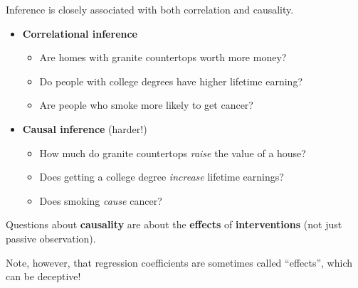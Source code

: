 \documentclass[
  letterpaper,
  DIV=11,
  numbers=noendperiod]{scrreprt}
\providecommand{\tightlist}{%
  \setlength{\itemsep}{0pt}\setlength{\parskip}{0pt}}\usepackage{longtable,booktabs,array}
\begin{document}
Inference is closely associated with both correlation and causality.

\begin{itemize}
\tightlist
\item
  \textbf{Correlational inference}

  \begin{itemize}
  \tightlist
  \item
    Are homes with granite countertops worth more money?
  \item
    Do people with college degrees have higher lifetime earning?
  \item
    Are people who smoke more likely to get cancer?
  \end{itemize}
\item
  \textbf{Causal inference} (harder!)

  \begin{itemize}
  \tightlist
  \item
    How much do granite countertops \emph{raise} the value of a house?
  \item
    Does getting a college degree \emph{increase} lifetime earnings?
  \item
    Does smoking \emph{cause} cancer?
  \end{itemize}
\end{itemize}

Questions about \textbf{causality} are about the \textbf{effects} of
\textbf{interventions} (not just passive observation).

Note, however, that regression coefficients are sometimes called
``effects'', which can be deceptive!
\end{document}
